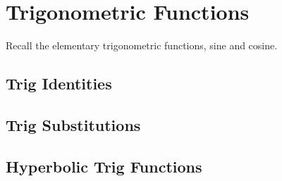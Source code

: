 \chapter{Trigonometric Functions}
Recall the elementary trigonometric functions, sine and cosine. 
\section{Trig Identities}
\section{Trig Substitutions}
\section{Hyperbolic Trig Functions}
